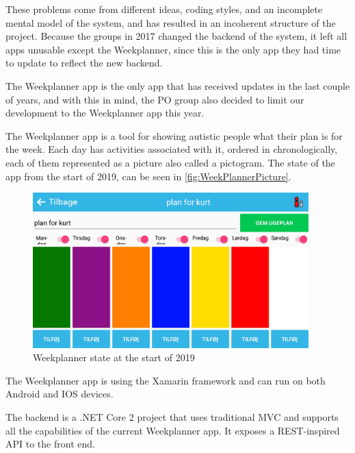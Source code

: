 These problems come from different ideas, coding styles, and an incomplete mental model of the system, and has resulted in an incoherent structure of the project. Because the groups in 2017 \cite{SW608F18} changed the backend of the system, it left all apps unusable except the Weekplanner, since this is the only app they had time to update to reflect the new backend.

The Weekplanner app is the only app that has received updates in the last couple of years, and with this in mind, the \gls{PO} group also decided to limit our development to the Weekplanner app this year.

The Weekplanner app is a tool for showing autistic people what their plan is for the week. Each day has activities associated with it, ordered in chronologically, each of them represented as a picture also called a pictogram. The state of the app from the start of 2019, can be seen in \autoref{fig:WeekPlannerPicture}.

\begin{figure}[H]
        \begin{center}
            \includegraphics[width=0.95\textwidth]{figures/WeekPlannerPicture}
        \end{center}
        \caption{Weekplanner state at the start of 2019}
        \label{fig:WeekPlannerPicture}
\end{figure}

The Weekplanner app is using the Xamarin framework and can run on both Android and IOS devices.

The backend is a .NET Core 2 project that uses traditional MVC and supports all the capabilities of the current Weekplanner app. It exposes a REST-inspired API to the front end.
